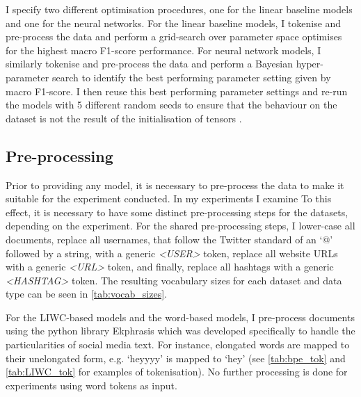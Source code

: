 I specify two different optimisation procedures, one for the linear baseline models and one for the neural networks.  
For the linear baseline models, I tokenise and pre-process the data and perform a grid-search over  parameter space  optimises for the highest macro F1-score performance.  
For neural network models, I similarly tokenise and pre-process the data and perform a Bayesian hyper-parameter search to identify the best performing parameter setting given by macro F1-score.  
I then reuse this best performing parameter settings and re-run the models with 5 different random seeds to ensure that the  behaviour on the dataset is not the result of the  initialisation of  tensors .  
  
\subsection{Pre-processing}  
Prior to providing  any model, it is necessary to pre-process the data to make it suitable for the experiment conducted.  
In my experiments I examine   
To this effect, it is necessary to have some  distinct pre-processing steps for the datasets, depending on the experiment.  
For the shared pre-processing steps, I lower-case all documents, replace all usernames, that follow the Twitter standard of an `@' followed by a string, with a generic \textit{<USER>} token, replace all website URLs with a generic \textit{<URL>} token, and finally, replace all hashtags with a generic \textit{<HASHTAG>} token.  
The resulting vocabulary sizes for each dataset and data type can be seen in \cref{tab:vocab_sizes}.  
  
For the LIWC-based models and the word-based models, I pre-process documents using the python library Ekphrasis \citep{baziotis:2017} which was developed specifically to handle the particularities of social media text.  
For instance, elongated words are mapped to their unelongated form, e.g. `heyyyy' is mapped to `hey' (see \cref{tab:bpe_tok} and \cref{tab:LIWC_tok} for examples of tokenisation).  
No further processing is done for experiments using word tokens as input.  
  
